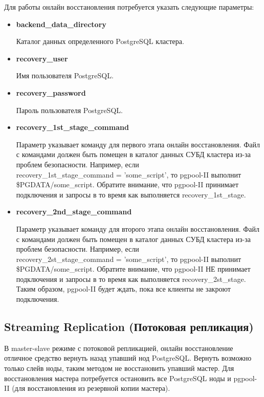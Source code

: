 Для работы онлайн восстановления потребуется указать следующие параметры:
\begin{itemize}
\item \textbf{backend\_data\_directory}

Каталог данных определенного PostgreSQL кластера.

\item \textbf{recovery\_user}

Имя пользователя PostgreSQL.

\item \textbf{recovery\_password}

Пароль пользователя PostgreSQL.

\item \textbf{recovery\_1st\_stage\_command}

Параметр указывает команду для первого этапа онлайн восстановления. 
Файл с командами должен быть помещен в каталог данных СУБД кластера из-за проблем безопасности. 
Например, если \\recovery\_1st\_stage\_command = 'some\_script', 
то pgpool-II выполнит \$PGDATA/some\_script. 
Обратите внимание, что pgpool-II принимает подключения и запросы в то время как выполняется recovery\_1st\_stage.

\item \textbf{recovery\_2nd\_stage\_command}

Параметр указывает команду для второго этапа онлайн восстановления. 
Файл с командами должен быть помещен в каталог данных СУБД кластера из-за проблем безопасности. 
Например, если \\recovery\_2st\_stage\_command = 'some\_script', 
то pgpool-II выполнит \$PGDATA/some\_script. 
Обратите внимание, что pgpool-II НЕ принимает подключения и запросы в то время как выполняется recovery\_2st\_stage.
Таким образом, pgpool-II будет ждать, пока все клиенты не закроют подключения.

\end{itemize}


\subsection{Streaming Replication (Потоковая репликация)}
В master-slave режиме с потоковой репликацией, онлайн восстановление отличное средство вернуть назад упавший нод PostgreSQL. 
Вернуть возможно только слейв ноды, таким методом не восстановить упавший мастер. Для восстановления мастера потребуется остановить 
все PostgreSQL ноды и pgpool-II (для восстановления из резервной копии мастера).


